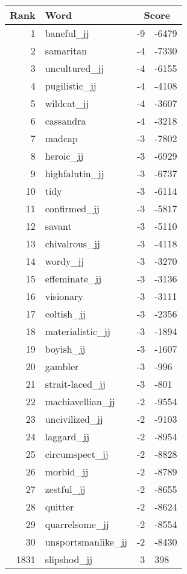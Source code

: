 \begin{longtable}[!htbp]{| rlr@{.}l |}
    \hline
    \textbf{Rank} & \textbf{Word} & \multicolumn{2}{c|}{\textbf{Score}} \\
    \hline
    \endhead
    1 & baneful\_jj & -9 & -6479 \\
    2 & samaritan & -4 & -7330 \\
    3 & uncultured\_jj & -4 & -6155 \\
    4 & pugilistic\_jj & -4 & -4108 \\
    5 & wildcat\_jj & -4 & -3607 \\
    6 & cassandra & -4 & -3218 \\
    7 & madcap & -3 & -7802 \\
    8 & heroic\_jj & -3 & -6929 \\
    9 & highfalutin\_jj & -3 & -6737 \\
    10 & tidy & -3 & -6114 \\
    11 & confirmed\_jj & -3 & -5817 \\
    12 & savant & -3 & -5110 \\
    13 & chivalrous\_jj & -3 & -4118 \\
    14 & wordy\_jj & -3 & -3270 \\
    15 & effeminate\_jj & -3 & -3136 \\
    16 & visionary & -3 & -3111 \\
    17 & coltish\_jj & -3 & -2356 \\
    18 & materialistic\_jj & -3 & -1894 \\
    19 & boyish\_jj & -3 & -1607 \\
    20 & gambler & -3 & -996 \\
    21 & strait-laced\_jj & -3 & -801 \\
    22 & machiavellian\_jj & -2 & -9554 \\
    23 & uncivilized\_jj & -2 & -9103 \\
    24 & laggard\_jj & -2 & -8954 \\
    25 & circumspect\_jj & -2 & -8828 \\
    26 & morbid\_jj & -2 & -8789 \\
    27 & zestful\_jj & -2 & -8655 \\
    28 & quitter & -2 & -8624 \\
    29 & quarrelsome\_jj & -2 & -8554 \\
    30 & unsportsmanlike\_jj & -2 & -8430 \\
    1831 & slipshod\_jj & 3 & 398 \\

\end{longtable}
